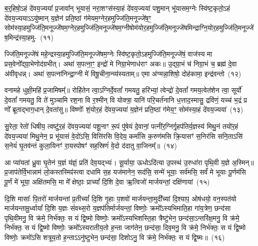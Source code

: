 {\anuvakamend[{उ॒प॒ह॒वं जुष्टा॑ नस्त्वा॒ षट् च॑}]}

ब॒र्॒\mbox{}हिषो॒\-ऽहं दे॑वय॒ज्यया᳚ प्र॒जावा᳚न् भूयासं॒ नरा॒शꣳस॑स्या॒हं दे॑वय॒ज्यया॑ पशु॒मान् भू॑यासम॒ग्नेः स्वि॑ष्ट॒कृतो॒\-ऽहं दे॑वय॒ज्यया\-ऽऽ\-यु॑ष्मान् य॒ज्ञेन॑ प्रति॒ष्ठां ग॑मेयम॒ग्ने\-र॒हमुज्जि॑ति॒\-मनूज्जे॑ष॒ꣳ॒ सोम॑\-स्या॒\-हमुज्जि॑ति॒\-मनूज्जे॑षम॒ग्नेर॒हमुज्जि॑ति॒\-मनूज्जे॑षम॒ग्नी\-षोम॑यो\-र॒ह\-मु\-ज्जि॑ति॒\-मनूज्जे॑ष\-मिन्द्राग्नि॒यो\-र॒हमुज्जि॑ति॒\-मनूज्जे॑ष॒\-मिन्द्र॑स्या॒हमु-~(११)\ip

ज्जि॑ति॒मनूज्जे॑षं महे॒न्द्रस्या॒हमुज्जि॑ति॒\-मनूज्जे॑षम॒ग्नेः स्वि॑ष्ट॒कृतो॒\-ऽहमुज्जि॑ति॒मनूज्जे॑षं॒ वाज॑स्य मा प्रस॒वेनो᳚द्ग्रा॒भेणोद॑\-ग्रभीत्। अथा॑ स॒पत्ना॒ꣳ॒ इन्द्रो॑ मे निग्रा॒भेणाध॑राꣳ अकः॥ उ॒द्ग्रा॒भं च॑ निग्रा॒भं च॒ ब्रह्म॑ दे॒वा अ॑वीवृधन्न्। अथा॑ स॒पत्ना॑निन्द्रा॒ग्नी मे॑ विषू॒चीना॒न्व्य॑स्यताम्॥ एमा अ॑ग्मन्ना॒शिषो॒ दोह॑कामा॒ इन्द्र॑वन्तो~(१२)\ip

वनामहे धुक्षी॒महि॑ प्र॒जामिषम्᳚॥ रोहि॑तेन त्वा॒\-ऽग्निर्दे॒वतां᳚ गमयतु॒ हरि॑भ्यां॒ त्वेन्द्रो॑ दे॒वतां᳚ गमय॒त्वेत॑शेन त्वा॒ सूर्यो॑ दे॒वतां᳚ गमयतु॒ वि ते॑ मुञ्चामि रश॒ना वि र॒श्मीन् वि योक्त्रा॒ यानि॑ परि॒चर्त॑नानि ध॒त्ताद॒स्मासु॒ द्रवि॑णं॒ यच्च॑ भ॒द्रं प्र णो᳚ ब्रूताद्भाग॒धान् दे॒वता॑सु॥ विष्णोः᳚ शं॒योर॒हं दे॑वय॒ज्यया॑ य॒ज्ञेन॑ प्रति॒ष्ठां ग॑मेय॒ꣳ॒ सोम॑स्या॒हं दे॑वय॒ज्यया॑~(१३)\ip

सु॒रेता॒ रेतो॑ धिषीय॒ त्वष्टु॑र॒हं दे॑वय॒ज्यया॑ पशू॒नाꣳ रू॒पं पु॑षेयं दे॒वानां॒ पत्नी॑र॒ग्निर्गृ॒ह\-प॑तिर्य॒ज्ञस्य॑ मिथु॒नं तयो॑र॒हं दे॑वय॒ज्यया॑ मिथु॒नेन॒ प्र भू॑यासं वे॒दो॑\-ऽसि॒ वित्ति॑रसि वि॒देय॒ कर्मा॑सि क॒रुण॑मसि क्रि॒यासꣳ॑ स॒निर॑सि सनि॒ता\-ऽसि॑ स॒नेयं॑ घृ॒तव॑न्तं कुला॒यिनꣳ॑ रा॒यस्पोषꣳ॑ सह॒स्रिणं॑ वे॒दो द॑दातु वा॒जिनम्᳚॥~(१४)\ip

{\anuvakamend[{इन्द्र॑स्या॒हमिन्द्र॑वन्तः॒ सोम॑स्या॒हं दे॑वय॒ज्यया॒ चतु॑श्चत्वारिꣳशच्च}]}

आ प्या॑यतां ध्रु॒वा घृ॒तेन॑ य॒ज्ञं य॑ज्ञं॒ प्रति॑ देव॒यद्भ्यः॑। सू॒र्याया॒ ऊधो\-ऽदि॑त्या उ॒पस्थ॑ उ॒रुधा॑रा पृथि॒वी य॒ज्ञे अ॒स्मिन्॥ प्र॒जा\-प॑तेर्वि॒भान्नाम॑ लो॒कस्तस्मिꣴ॑स्त्वा दधामि स॒ह यज॑मानेन॒ सद॑सि॒ सन्मे॑ भूयाः॒ सर्व॑मसि॒ सर्वं॑ मे भूयाः पू॒र्णम॑सि पू॒र्णं मे॑ भूया॒ अक्षि॑तमसि॒ मा मे᳚ क्षेष्ठाः॒ प्राच्यां᳚ दि॒शि दे॒वा ऋ॒त्विजो॑ मार्जयन्तां॒ दक्षि॑णायां~(१५)\ip

दि॒शि मासाः᳚ पि॒तरो॑ मार्जयन्तां प्र॒तीच्यां᳚ दि॒शि गृ॒हाः प॒शवो॑ मार्जयन्ता॒मुदी᳚च्यां दि॒श्याप॒ ओष॑धयो॒ वन॒स्पत॑यो मार्जयन्तामू॒र्ध्वायां᳚ दि॒शि य॒ज्ञः सं॑वथ्स॒रो य॒ज्ञप॑तिर्मार्जयन्तां॒ विष्णोः॒ क्रमो᳚\-ऽस्यभिमाति॒हा गा॑य॒त्रेण॒ छन्द॑सा पृथि॒वीमनु॒ वि क्र॑मे॒ निर्भ॑क्तः॒ स यं द्वि॒ष्मो विष्णोः॒ क्रमो᳚\-ऽस्यभिशस्ति॒हा त्रैष्टु॑भेन॒ छन्द॑सा॒\-ऽन्तरि॑क्ष॒मनु॒ वि क्र॑मे॒ निर्भ॑क्तः॒ स यं द्वि॒ष्मो विष्णोः॒ क्रमो᳚\-ऽस्यरातीय॒तो ह॒न्ता जाग॑तेन॒ छन्द॑सा॒ दिव॒मनु॒ वि क्र॑मे॒ निर्भ॑क्तः॒ स यं द्वि॒ष्मो विष्णोः॒ क्रमो॑\-ऽसि शत्रूय॒तो ह॒न्ता\-ऽऽ\-नु॑ष्टुभेन॒ छन्द॑सा॒ दिशो\-ऽनु॒ वि क्र॑मे॒ निर्भ॑क्तः॒ स यं द्वि॒ष्मः॥~(१६)\ip

